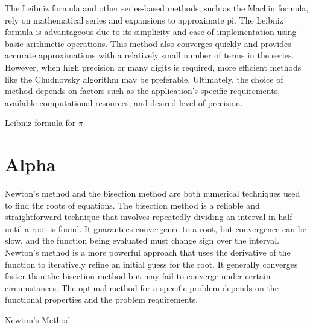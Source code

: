 \noindent The Leibniz formula\cite{pi-leibniz} and other series-based methods, such as the Machin formula, rely on mathematical series and expansions to approximate pi. The Leibniz formula is advantageous due to its simplicity and ease of implementation using basic arithmetic operations. This method also converges quickly and provides accurate approximations with a relatively small number of terms in the series. However, when high precision or many digits is required, more efficient methods like the Chudnovsky algorithm may be preferable. Ultimately, the choice of method depends on factors such as the application's specific requirements, available computational resources, and desired level of precision.

\begin{algorithm}[H]
\caption{Leibniz formula for $\pi$}\label{algo:leibniz}
\begin{algorithmic}[1]
\EndFor
{}
\end{algorithmic}
\end{algorithm}\newpage

\section{Alpha}
\noindent Newton's method\cite{newton-method} and the bisection method are both numerical techniques used to find the roots of equations. The bisection method is a reliable and straightforward technique that involves repeatedly dividing an interval in half until a root is found. It guarantees convergence to a root, but convergence can be slow, and the function being evaluated must change sign over the interval. Newton's method is a more powerful approach that uses the derivative of the function to iteratively refine an initial guess for the root. It generally converges faster than the bisection method but may fail to converge under certain circumstances. The optimal method for a specific problem depends on the functional properties and the problem requirements.

\begin{algorithm}[H]
\caption{Newton's Method}\label{algo:newton}
\begin{algorithmic}[1]
\EndWhile
{}
\end{algorithmic}
\end{algorithm}

